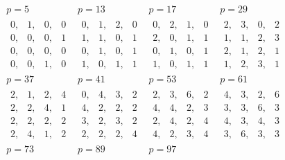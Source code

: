 \documentclass[twoside,12pt]{memoir}
\begin{document}
\[ \begin{array}{c|c|c|c}
p=5 & p=13 & p=17 & p=29 \\
\begin{array}{llll} 0,&1,&0,&0\\0,&0,&0,&1\\0,&0,&0,&0\\0,&0,&1,&0 \end{array} &
\begin{array}{llll} 0,&1,&2,&0\\1,&1,&0,&1\\0,&1,&0,&1\\1,&0,&1,&1 \end{array}&
\begin{array}{llll} 0,&2,&1,&0\\2,&0,&1,&1\\0,&1,&0,&1\\1,&0,&1,&1 \end{array} &
\begin{array}{llll} 2,&3,&0,&2\\1,&1,&2,&3\\2,&1,&2,&1\\1,&2,&3,&1 \end{array} \\ \hline
p=37 & p=41 & p=53 & p=61 \\
\begin{array}{llll} 2,&1,&2,&4\\2,&2,&4,&1\\2,&2,&2,&2\\2,&4,&1,&2 \end{array} &
\begin{array}{llll} 0,&4,&3,&2\\4,&2,&2,&2\\3,&2,&3,&2\\2,&2,&2,&4 \end{array}&
\begin{array}{llll} 2,&3,&6,&2\\4,&4,&2,&3\\2,&4,&2,&4\\4,&2,&3,&4 \end{array} &
\begin{array}{llll} 4,&3,&2,&6\\3,&3,&6,&3\\4,&3,&4,&3\\3,&6,&3,&3 \end{array} \\ \hline 
p=73 & p=89 & p=97 & \\

\end{array}\]
\end{document}

